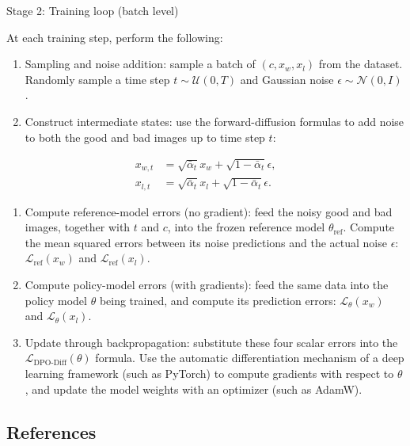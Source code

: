 Stage 2: Training loop (batch level)

At each training step, perform the following:

\begin{enumerate}
\def\labelenumi{\arabic{enumi}.}
\tightlist
\item
  Sampling and noise addition: sample a batch of \((c,x_w,x_l)\) from the dataset. Randomly sample a time step \(t\sim\mathcal{U}(0,T)\) and Gaussian noise \(\epsilon\sim\mathcal{N}(0,I)\).
\item
{}
  Construct intermediate states: use the forward-diffusion formulas to add noise to both the good and bad images up to time step \(t\):
\end{enumerate}

\[
\begin{aligned}
x_{w,t} &= \sqrt{\bar{\alpha}_t}x_w+\sqrt{1-\bar{\alpha}_t}\epsilon,\\
x_{l,t} &= \sqrt{\bar{\alpha}_t}x_l+\sqrt{1-\bar{\alpha}_t}\epsilon.
\end{aligned}
\]

\begin{enumerate}
\def\labelenumi{\arabic{enumi}.}
\setcounter{enumi}{2}
\tightlist
\item
  Compute reference-model errors (no gradient): feed the noisy good and bad images, together with \(t\) and \(c\), into the frozen reference model \(\theta_{\mathrm{ref}}\). Compute the mean squared errors between its noise predictions and the actual noise \(\epsilon\): \(\mathcal{L}_{\mathrm{ref}}(x_w)\) and \(\mathcal{L}_{\mathrm{ref}}(x_l)\).
\item
  Compute policy-model errors (with gradients): feed the same data into the policy model \(\theta\) being trained, and compute its prediction errors: \(\mathcal{L}_\theta(x_w)\) and \(\mathcal{L}_\theta(x_l)\).
\item
  Update through backpropagation: substitute these four scalar errors into the \(\mathcal{L}_{\mathrm{DPO}\text{-}\mathrm{Diff}}(\theta)\) formula. Use the automatic differentiation mechanism of a deep learning framework (such as PyTorch) to compute gradients with respect to \(\theta\), and update the model weights with an optimizer (such as AdamW).
\end{enumerate}

\FloatBarrier
{}
\hypertarget{references-134}{%
\subsection{References}\label{references-134}}

